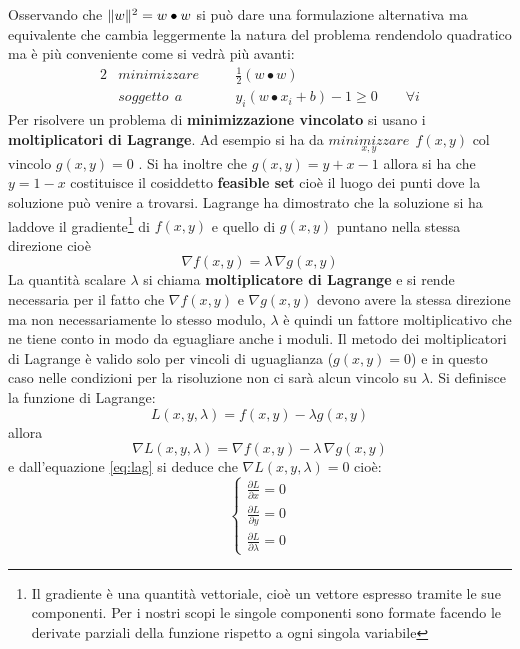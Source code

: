 Osservando che $\lVert w\rVert^{2} = w \bullet w$ si può dare una formulazione  alternativa ma equivalente che cambia leggermente la natura del problema rendendolo quadratico ma è più conveniente come si vedrà più avanti:
\begin{alignat}{2}
\label{eq:svmpro1}
&minimizzare \quad&&\frac{1}{2}(w \bullet w) \\
\label{eq:svmpro2}
&soggetto \:\:a &&y_i(w \bullet x_i +b) - 1 \geq 0 \qquad \forall i
\end{alignat}
 Per risolvere un problema di \textbf{minimizzazione vincolato} si usano i \textbf{moltiplicatori di Lagrange}. Ad esempio si ha da $\underset{x,y}{minimizzare} \:\: f(x,y)$ col vincolo $g(x,y) = 0$ . Si ha inoltre che $g(x,y) = y+x-1$ allora si ha che $y = 1 - x$ costituisce il cosiddetto \textbf{feasible set} cioè il luogo dei punti dove la soluzione può venire a trovarsi. Lagrange ha dimostrato che la soluzione si ha laddove il gradiente\footnote{Il gradiente è una quantità vettoriale, cioè un vettore espresso tramite le sue componenti. Per i nostri scopi le singole componenti sono formate facendo le derivate parziali della funzione rispetto a ogni singola variabile}  di $f(x,y)$  e quello di $g(x,y)$ puntano nella stessa direzione cioè 
 \begin{equation}
 \label{eq:lag}
 \nabla f(x,y) = \lambda \,\nabla g(x,y)
 \end{equation}
  La quantità scalare $\lambda$ si chiama \textbf{moltiplicatore di Lagrange} e si rende necessaria per il fatto che $\nabla f(x,y) \text{ e } \nabla g(x,y)$ devono avere la stessa direzione ma non necessariamente lo stesso modulo, $\lambda$ è quindi un fattore moltiplicativo che ne tiene conto in modo da eguagliare anche i moduli. Il metodo dei moltiplicatori di Lagrange è valido solo per vincoli di uguaglianza ($g(x,y) = 0$) e in questo caso nelle condizioni per la risoluzione non ci sarà alcun vincolo su $\lambda$. Si definisce la funzione di Lagrange:
 \begin{equation*}
 L(x,y,\lambda) = f(x,y) - \lambda g(x,y) 
 \end{equation*}
 allora 
 \begin{equation*}
 \nabla L(x,y,\lambda) = \nabla f(x,y) - \lambda \, \nabla g(x,y)
 \end{equation*}
e dall'equazione \eqref{eq:lag} si deduce che $\nabla L(x,y,\lambda) = 0$ cioè:
\[
\begin{cases}
\frac{\partial L}{\partial x} = 0 \\
\frac{\partial L}{\partial y} = 0 \\
\frac{\partial L}{\partial \lambda} = 0
\end{cases}
\]
